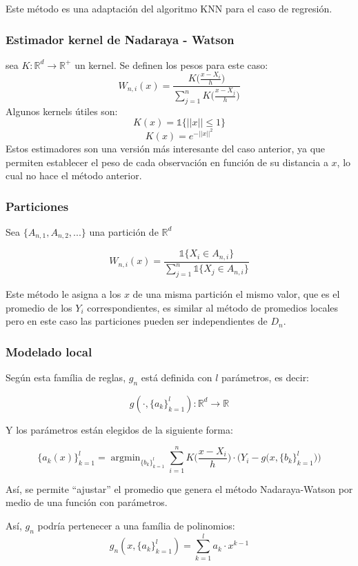 \documentclass[12pt, a4paper]{article}
\begin{document}
Este método es una adaptación del algoritmo KNN para el caso de regresión.
\subsubsection{Estimador kernel de Nadaraya - Watson}
sea $K:\mathds{R}^d \rightarrow \mathds{R}^{+}$ un kernel.
Se definen los pesos para este caso:
$$ W_{n,i}(x)=\frac{ K \big ( \frac{x-X_i}{h} \big ) }{ \sum_{j=1}^n K \big ( \frac{x-X_j}{h} \big )} $$
Algunos kernels útiles son:
$$ K(x)=\mathds{1}\{ || x || \leq 1 \} $$
$$ K(x)=e^{-||x||^2}$$
Estos estimadores son una versión más interesante del caso anterior, ya que permiten establecer el peso de cada observación en función de su distancia a $x$, lo cual no hace el método anterior.

\subsubsection{Particiones}
Sea $\{A_{n,1}, A_{n,2}, ...\}$ una partición de $\mathds{R}^d$

$$ W_{n,i}(x) = \frac{\mathds{1}\{ X_i \in A_{n,i} \}}{ \sum_{j=1}^{n} \mathds{1}\{ X_j \in A_{n,i} \}} $$

Este método le asigna a los $x$ de una  misma partición el mismo valor, que es el promedio de los $Y_i$ correspondientes, es similar al método de promedios locales pero en este caso las particiones pueden ser independientes de $D_n$.

\subsubsection{Modelado local}

Según esta família de reglas, $g_n$ está definida con $l$ parámetros, es decir:

$$ g( \cdot , \{ a_k \}_{k=1}^{l} ):\mathds{R}^d \rightarrow \mathds{R} $$

Y los parámetros están elegidos de la siguiente forma:

$$ \{ a_k(x) \}_{k=1}^l = \mathop{argmin}_{\{b_k\}_{k=1}^l} \sum_{i=1}^n K\bigg (\frac{x-X_i}{h} \bigg ) \cdot \bigg ( Y_i - g \big (x, \{ b_k \}_{k=1}^{l} \big ) \bigg )$$

Así, se permite ``ajustar'' el promedio que genera el método Nadaraya-Watson por medio de una función con parámetros.

Así, $g_n$ podría pertenecer a una família de polinomios: $$ g_n(x,\{ a_k \}_{k=1}^l)=\sum _{k=1}^{l} a_k \cdot x^{k-1}$$
\end{document}
